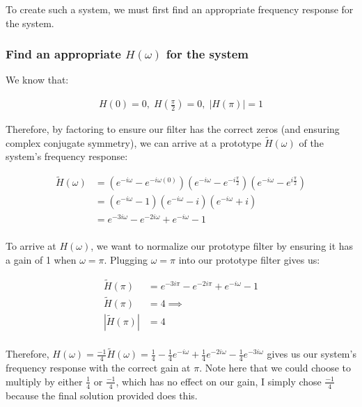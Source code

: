 \documentclass{article}
\newenvironment{directsubsubs}{
  \makeatletter
  \renewcommand\thesubsubsection{\thesection.\Roman{subsubsection}}
  \makeatother
}{
  \makeatletter
  \renewcommand\thesubsubsection{\thesubsection.\Roman{subsubsection}}
  \makeatother
}
\renewcommand{\thesubsection}{\thesection.\alph{subsection}}
\renewcommand{\thesubsubsection}{\thesection.\alph{subsection}.\Roman{subsubsection}}
\begin{document}
To create such a system, we must first find an appropriate frequency response for the system.

\begin{directsubsubs}

\subsubsection[~\thesubsubsection]{Find an appropriate $H(\omega)$ for the system}

We know that:

\begin{align*}
	H(0) = 0, \; H(\frac{\pi}{2}) = 0, \; |H(\pi)| = 1
\end{align*}

Therefore, by factoring to ensure our filter has the correct zeros (and ensuring complex conjugate symmetry), we can arrive at a prototype $\tilde{H}(\omega)$ of the system's frequency response:

\begin{align*}
	\tilde{H}(\omega) &= (e^{-i{\omega}} - e^{-i{\omega}(0)})(e^{-i{\omega}} - e^{-i{\frac{\pi}{2}}})(e^{-i{\omega}} - e^{i{\frac{\pi}{2}}}) \\
	&= (e^{-i{\omega}} - 1)(e^{-i{\omega}} - i)(e^{-i{\omega}} + i) \\
	&= e^{-3i{\omega}} - e^{-2i{\omega}} + e^{-i{\omega}} - 1 \\
\end{align*}

To arrive at $H(\omega)$, we want to normalize our prototype filter by ensuring it has a gain of 1 when $\omega = \pi$. Plugging $\omega = \pi$ into our prototype filter gives us:

\begin{align*}
	\tilde{H}(\pi) &= e^{-3i{\pi}} - e^{-2i{\pi}} + e^{-i{\omega}} - 1 \\
	\tilde{H}(\pi) &= 4 \implies \\
	|\tilde{H}(\pi)| &= 4 \\
\end{align*}

Therefore, $H(\omega) = \frac{-1}{4}\tilde{H}(\omega) = \frac{1}{4} - \frac{1}{4}e^{-i{\omega}} + \frac{1}{4}e^{-2i{\omega}} - \frac{1}{4}e^{-3i{\omega}}$ gives us our system's frequency response with the correct gain at $\pi$. Note here that we could choose to multiply by either $\frac{1}{4}$ or $\frac{-1}{4}$, which has no effect on our gain, I simply chose $\frac{-1}{4}$ because the final solution provided does this.


\end{directsubsubs}
\end{document}
